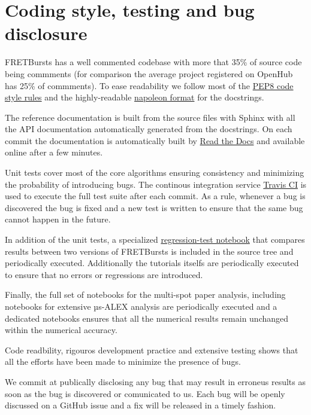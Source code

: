 \section{Coding style, testing and bug disclosure}

FRETBursts has a well commented codebase with more that 35\% of source code
being commments (for comparison the average project registered on OpenHub has 25\%
of commments). To ease readability we follow most of the 
\href{https://www.python.org/dev/peps/pep-0008/}{PEP8 code style rules} and 
the highly-readable \href{http://sphinxcontrib-napoleon.readthedocs.org/}{napoleon format}
for the docstrings.

The reference documentation is built from the source files with Sphinx with
all the API documentation automatically generated from the docstrings.
On each commit the documentation is automatically built by 
\href{https://readthedocs.org/}{Read the Docs}
and available online after a few minutes.

Unit tests cover most of the core algorithms ensuring consistency and 
minimizing the probability of introducing bugs. The continous integration
service \href{http://travis-ci.org}{Travis CI} is used to execute the full
test suite after each commit.
As a rule, whenever a bug is discovered the bug is fixed and a new test is 
written to ensure that the same bug cannot happen in the future.

In addition of the unit tests, a specialized 
\href{https://github.com/tritemio/FRETBursts/blob/master/notebooks/dev/tests/FRETBursts\%20-\%20Regression\%20tests.ipynb}{regression-test notebook}
that compares results between two versions of FRETBursts is
included in the source tree and periodically executed. Additionally
the tutorials itselfs are periodically executed to ensure that
no errors or regressions are introduced.

Finally, the full set of notebooks for the multi-spot paper analysis,
including notebooks for extensive µs-ALEX analysis are periodically
executed and a dedicated notebooks ensures that all the numerical
results remain unchanged within the numerical accuracy.

Code readbility, rigouros development practice and extensive testing
shows that all the efforts have been made to minimize the presence 
of bugs.

We commit at publically disclosing any bug that may result in erroneus results 
as soon as the bug is discovered or comunicated to us.
Each bug will be openly discussed on a GitHub issue and a fix will be released 
in a timely fashion.
